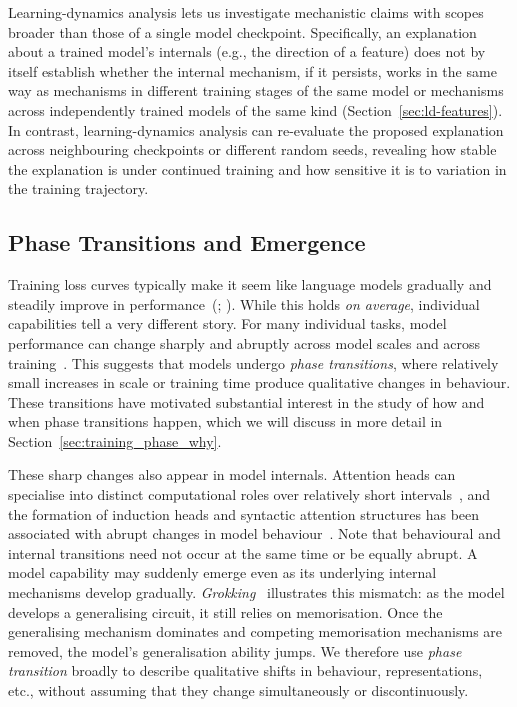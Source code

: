 Learning-dynamics analysis lets us investigate mechanistic claims with scopes broader than those of a single model checkpoint. Specifically, an explanation about a trained model’s internals (e.g., the direction of a feature) does not by itself establish whether the internal mechanism, if it persists, works in the same way as mechanisms in different training stages of the same model or mechanisms across independently trained models of the same kind (Section~\ref{sec:ld-features}). In contrast, learning-dynamics analysis can re-evaluate the proposed explanation across neighbouring checkpoints or different random seeds, revealing how stable the explanation is under continued training and how sensitive it is to variation in the training trajectory.

\subsection{Phase Transitions and Emergence}
\label{sec:ld-transitions}

Training loss curves typically make it seem like language models gradually and steadily improve in performance~(; ). While this holds \emph{on average}, individual capabilities tell a very different story. For many individual tasks, model performance can change sharply and abruptly across model scales and across training~. This suggests that models undergo \emph{phase transitions}, where relatively small increases in scale or training time produce qualitative changes in behaviour. These transitions have motivated substantial interest in the study of how and when phase transitions happen, which we will discuss in more detail in Section~\ref{sec:training_phase_why}.

These sharp changes also appear in model internals. Attention heads can specialise into distinct computational roles over relatively short intervals~, and the formation of induction heads and syntactic attention structures has been associated with abrupt changes in model behaviour~. Note that behavioural and internal transitions need not occur at the same time or be equally abrupt. A model capability may suddenly emerge even as its underlying internal mechanisms develop gradually. \emph{Grokking}~ illustrates this mismatch: as the model develops a generalising circuit, it still relies on memorisation. Once the generalising mechanism dominates and competing memorisation mechanisms are removed, the model’s generalisation ability jumps. We therefore use \emph{phase transition} broadly to describe qualitative shifts in behaviour, representations, etc., without assuming that they change simultaneously or discontinuously.

